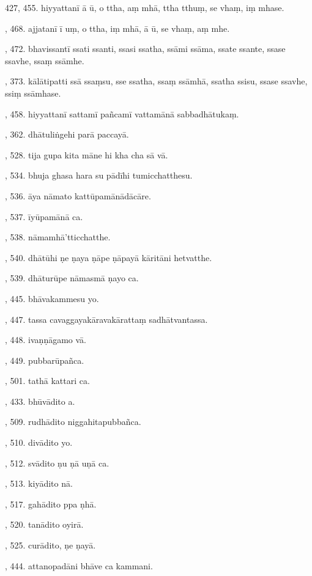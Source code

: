 427, 455. hiyyattanī ā ū, o ttha, aṃ mhā, ttha tthuṃ, se vhaṃ, iṃ mhase.\par {}, 468. ajjatanī ī uṃ, o ttha, iṃ mhā, ā ū, se vhaṃ, aṃ mhe.\par {}, 472. bhavissantī ssati ssanti, ssasi ssatha, ssāmi ssāma, ssate ssante, ssase ssavhe, ssaṃ ssāmhe.\par {}, 373. kālātipatti ssā ssaṃsu, sse ssatha, ssaṃ ssāmhā, ssatha ssisu, ssase ssavhe, ssiṃ ssāmhase.\par {}, 458. hiyyattanī sattamī pañcamī vattamānā sabbadhātukaṃ.\par {}, 362. dhātuliṅgehi parā paccayā.\par {}, 528. tija gupa kita māne hi kha cha sā vā.\par {}, 534. bhuja ghasa hara su pādīhi tumicchatthesu.\par {}, 536. āya nāmato kattūpamānādācāre.\par {}, 537. īyūpamānā ca.\par {}, 538. nāmamhā’tticchatthe.\par {}, 540. dhātūhi ṇe ṇaya ṇāpe ṇāpayā kāritāni hetvatthe.\par {}, 539. dhāturūpe nāmasmā ṇayo ca.\par {}, 445. bhāvakammesu yo.\par {}, 447. tassa cavaggayakāravakārattaṃ sadhātvantassa.\par {}, 448. ivaṇṇāgamo vā.\par {}, 449. pubbarūpañca.\par {}, 501. tathā kattari ca.\par {}, 433. bhūvādito a.\par {}, 509. rudhādito niggahitapubbañca.\par {}, 510. divādito yo.\par {}, 512. svādito ṇu ṇā uṇā ca.\par {}, 513. kiyādito nā.\par {}, 517. gahādito ppa ṇhā.\par {}, 520. tanādito oyirā.\par {}, 525. curādito, ṇe ṇayā.\par {}, 444. attanopadāni bhāve ca kammani.\par \noindent
